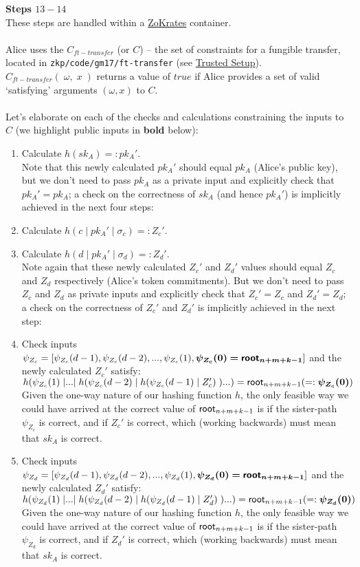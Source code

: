 \textbf{Steps $13 - 14$}
\ \\
These steps are handled within a \hyperref[sec:zokrates]{ZoKrates} container.\\
\\
Alice uses the $C_{ft-transfer}$ (or $C$) -- the set of constraints for a fungible transfer, located in \texttt{zkp/code/gm17/ft-transfer} (see \hyperref[sec:trustedSetup]{Trusted Setup}). $C_{ft-transfer}(\;\omega,\;x\;)$ returns a value of $true$ if Alice provides a set of valid `satisfying' arguments $(\omega, x)$ to $C$.\\
\\
Let's elaborate on each of the checks and calculations constraining the inputs to $C$ (we highlight public inputs in \textbf{bold} below):
\begin{enumerate}
  \item Calculate $h(sk_A) =: pk_A'$.\\
    Note that this newly calculated $pk_A'$ should equal $pk_A$ (Alice's public key), but we don't need to pass $pk_A$ as a private input and explicitly check that $pk_A'=pk_A$; a check on the correctness of $sk_A$ (and hence $pk_A'$) is implicitly achieved in the next four steps:
  \item Calculate $h(c\;|\;pk_A'\;|\;\sigma_c) =: Z_c'$.\\
  \item Calculate $h(d\;|\;pk_A'\;|\;\sigma_d) =: Z_d'$.\\
    Note again that these newly calculated $Z_c'$ and $Z_d'$ values should equal $Z_c$ and $Z_d$ respectively (Alice's token commitments). But we don't need to pass $Z_c$ and $Z_d$ as private inputs and explicitly check that $Z_c'=Z_c$ and $Z_d'=Z_d$; a check on the correctness of $Z_c'$ and $Z_d'$ is implicitly achieved in the next step:
  \item Check inputs $\psi_{Z_c}=[\psi_{Z_c}(d-1), \psi_{Z_c}(d-2),..., \psi_{Z_c}(1), \bm{\psi_{Z_c}(0)=\mathsf{root}_{n+m+k-1}}]$ and the newly calculated $Z_c'$ satisfy:\\
    $h\br*{\psi_{Z_c}(1)\;|...|\;h\br*{\psi_{Z_c}(d-2)\;|\;h\br*{\psi_{Z_c}(d-1)\;|\;Z_c'}\;}...} = \roott_{n+m+k-1} ( =: \bm{\psi_{Z_c}(0)})$\\
    Given the one-way nature of our hashing function $h$, the only feasible way we could have arrived at the correct value of $\mathsf{root}_{n+m+k-1}$ is if the sister-path $\psi_{Z_c}$ is correct, and if $Z_c'$ is correct, which (working backwards) must mean that $sk_A$ is correct.
  \item Check inputs $\psi_{Z_d}=[\psi_{Z_d}(d-1), \psi_{Z_d}(d-2),..., \psi_{Z_d}(1), \bm{\psi_{Z_d}(0)=\mathsf{root}_{n+m+k-1}}]$ and the newly calculated $Z_d'$ satisfy:\\
    $h\br*{\psi_{Z_d}(1)\;|...|\;h\br*{\psi_{Z_d}(d-2)\;|\;h\br*{\psi_{Z_d}(d-1)\;|\;Z_d'}\;}...} = \roott_{n+m+k-1} ( =: \bm{\psi_{Z_d}(0)})$\\
    Given the one-way nature of our hashing function $h$, the only feasible way we could have arrived at the correct value of $\mathsf{root}_{n+m+k-1}$ is if the sister-path $\psi_{Z_d}$ is correct, and if $Z_d'$ is correct, which (working backwards) must mean that $sk_A$ is correct.


\end{enumerate}
